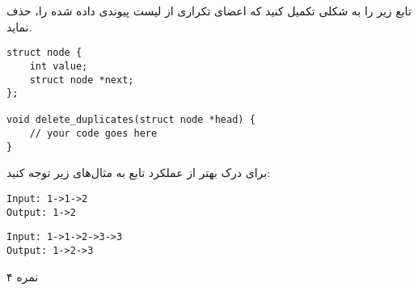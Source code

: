 
تابع زیر را به شکلی تکمیل کنید که اعضای تکراری از لیست پیوندی داده شده را، حذف نماید.

\begin{latin}
\begin{verbatim}
struct node {
    int value;
    struct node *next;
};

void delete_duplicates(struct node *head) {
    // your code goes here
}
\end{verbatim}
\end{latin}

برای درک بهتر از عملکرد تابع به مثال‌های زیر توجه کنید:

\begin{latin}
\begin{verbatim}
Input: 1->1->2
Output: 1->2
\end{verbatim}

\begin{verbatim}
Input: 1->1->2->3->3
Output: 1->2->3
\end{verbatim}
\end{latin}

۴ نمره


